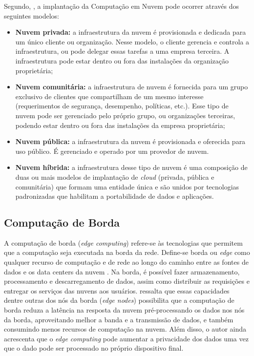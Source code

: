 Segundo, , a implantação da Computação em Nuvem pode
ocorrer através dos seguintes modelos:

\begin{itemize}
    
    \item \textbf{Nuvem privada:} a infraestrutura da nuvem é provisionada e
    dedicada para um único cliente ou organização. Nesse modelo, o cliente
    gerencia e controla a infraestrutura, ou pode delegar essas tarefas a uma
    empresa terceira. A infraestrutura pode estar dentro ou fora das instalações
    da organização proprietária;

    \item \textbf{Nuvem comunitária:} a infraestrutura de nuvem é fornecida para
    um grupo exclusivo de clientes que compartilham de um mesmo interesse
    (requerimentos de segurança, desempenho, políticas, etc.). Esse tipo de
    nuvem pode ser gerenciado pelo próprio grupo, ou organizações terceiras,
    podendo estar dentro ou fora das instalações da empresa proprietária;

    \item \textbf{Nuvem pública:} a infraestrutura da nuvem é provisionada e
    oferecida para uso público. É gerenciado e operado por um provedor de nuvem.
    
    \item \textbf{Nuvem híbrida:} a infraestrutura desse tipo de nuvem é uma
    composição de duas ou mais modelos de implantação de \emph{cloud} (privada,
    pública e comunitária) que formam uma entidade única e são unidos por
    tecnologias padronizadas que habilitam a portabilidade de dados e
    aplicações.

\end{itemize}

\subsection{Computação de Borda}

A computação de borda (\emph{edge computing}) refere-se às
tecnologias que permitem que a computação seja executada na borda da rede.
Define-se borda ou \emph{edge} como qualquer recurso de computação e de rede ao
longo do caminho entre as fontes de dados e os data centers da nuvem
\cite{Shi2016}. Na borda, é possível fazer armazenamento, processamento e
descarregamento de dados, assim como distribuir as requisições e entregar os
serviços das nuvens aos usuários.  ressalta que essas
capacidades dentre outras dos nós da borda (\emph{edge nodes}) possibilita que a
computação de borda reduza a latência na resposta da nuvem pré-processando os
dados nos nós da borda, aproveitando melhor a banda e a transmissão de dados, e
também consumindo menos recursos de computação na nuvem. Além disso, o autor
ainda acrescenta que o \emph{edge computing} pode aumentar a privacidade dos
dados uma vez que o dado pode ser processado no próprio dispositivo final.

